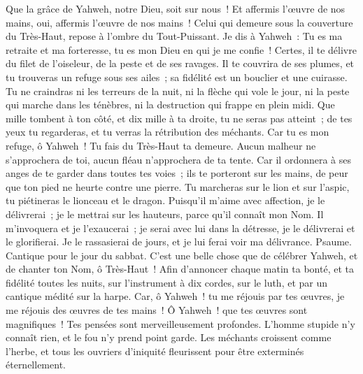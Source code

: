 \begin{multicols}{2}
Que la grâce de Yahweh, notre Dieu, soit sur nous~! Et affermis l'œuvre de nos mains, oui, affermis l'œuvre de nos mains~!
\VerseOne{}Celui qui demeure sous la couverture du Très-Haut, repose à l'ombre du Tout-Puissant.
Je dis à Yahweh~: Tu es ma retraite et ma forteresse, tu es mon Dieu en qui je me confie~!
Certes, il te délivre du filet de l'oiseleur, de la peste et de ses ravages.
Il te couvrira de ses plumes, et tu trouveras un refuge sous ses ailes~; sa fidélité est un bouclier et une cuirasse.
Tu ne craindras ni les terreurs de la nuit, ni la flèche qui vole le jour,
ni la peste qui marche dans les ténèbres, ni la destruction qui frappe en plein midi.
Que mille tombent à ton côté, et dix mille à ta droite, tu ne seras pas atteint~;
de tes yeux tu regarderas, et tu verras la rétribution des méchants.
Car tu es mon refuge, ô Yahweh~! Tu fais du Très-Haut ta demeure.
Aucun malheur ne s'approchera de toi, aucun fléau n'approchera de ta tente.
Car il ordonnera à ses anges de te garder dans toutes tes voies~;
ils te porteront sur les mains, de peur que ton pied ne heurte contre une pierre.
Tu marcheras sur le lion et sur l'aspic, tu piétineras le lionceau et le dragon.
Puisqu'il m'aime avec affection, je le délivrerai~; je le mettrai sur les hauteurs, parce qu'il connaît mon Nom.
Il m'invoquera et je l'exaucerai~; je serai avec lui dans la détresse, je le délivrerai et le glorifierai.
Je le rassasierai de jours, et je lui ferai voir ma délivrance.
\VerseOne{}Psaume. Cantique pour le jour du sabbat.
C'est une belle chose que de célébrer Yahweh, et de chanter ton Nom, ô Très-Haut~!
Afin d'annoncer chaque matin ta bonté, et ta fidélité toutes les nuits,
sur l'instrument à dix cordes, sur le luth, et par un cantique médité sur la harpe.
Car, ô Yahweh~! tu me réjouis par tes œuvres, je me réjouis des œuvres de tes mains~!
Ô Yahweh~! que tes œuvres sont magnifiques~! Tes pensées sont merveilleusement profondes.
L'homme stupide n'y connaît rien, et le fou n'y prend point garde.
Les méchants croissent comme l'herbe, et tous les ouvriers d'iniquité fleurissent pour être exterminés éternellement.

\end{multicols}
